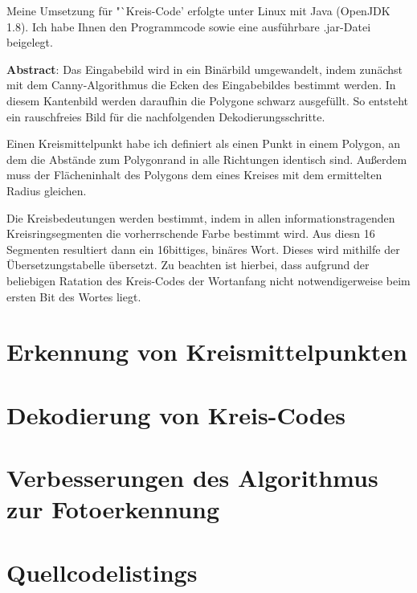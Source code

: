 \documentclass[a4paper, DIV=12, firstfoot=false, dvipsnames]{scrreprt}
\newcommand{\task}[1]{Kreis-Code}
\begin{document}
	\titlehead{Teilnahme 6745 (Team 00001) \hfill Laurenz Grote}
	\title{\task}
	\subtitle{Aufgabe 3}
	\author{Laurenz Friedrich Grote}
	\date{}
	\maketitle
	\tableofcontents
	\vspace {2em}
	Meine Umsetzung für "`\task"' erfolgte unter Linux mit Java (OpenJDK 1.8). Ich habe Ihnen den Programmcode sowie eine ausführbare .jar-Datei beigelegt.
	
	\vfill{}
	\textbf{Abstract}:
	Das Eingabebild wird in ein Binärbild umgewandelt, indem zunächst mit dem Canny-Algorithmus die Ecken des Eingabebildes bestimmt werden. In diesem Kantenbild werden daraufhin die Polygone schwarz ausgefüllt. So entsteht ein rauschfreies Bild für die nachfolgenden Dekodierungsschritte.

	Einen Kreismittelpunkt habe ich definiert als einen Punkt in einem Polygon, an dem die Abstände zum Polygonrand in alle Richtungen identisch sind. Außerdem muss der Flächeninhalt des Polygons dem eines Kreises mit dem ermittelten Radius gleichen.

	Die Kreisbedeutungen werden bestimmt, indem in allen informationstragenden Kreisringsegmenten die vorherrschende Farbe bestimmt wird. Aus diesn 16 Segmenten resultiert dann ein 16bittiges, binäres Wort. Dieses wird mithilfe der Übersetzungstabelle übersetzt. Zu beachten ist hierbei, dass aufgrund der beliebigen Ratation des \task{}s der Wortanfang nicht notwendigerweise beim ersten Bit des Wortes liegt.

	\pagebreak
	\chapter{Erkennung von Kreismittelpunkten}
		
	\chapter{Dekodierung von Kreis-Codes}
		
	\chapter{Verbesserungen des Algorithmus zur Fotoerkennung}
		
	\chapter{Quellcodelistings}
		
\end{document}

